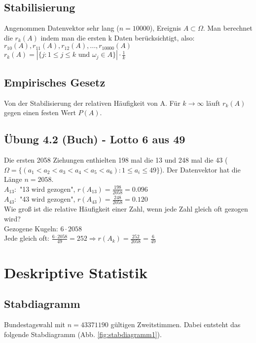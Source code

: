 \subsection{Stabilisierung}
Angenommen Datenvektor sehr lang ($ n = 10 000 $), Ereignis $A \subset \Omega $. Man berechnet die $ r_k(A) $ indem man die ersten k Daten berücksichtigt, also: $ r_{10}(A), r_{11}(A), r_{12}(A), ..., r_{10 000}(A) $ \\
$ r_k(A) = | \{ j : 1\leq j \leq k \textrm{ und } \omega_j \in A \} | \cdot \frac{1}{k} $


\subsection{Empirisches Gesetz}
Von der Stabilisierung der relativen Häufigkeit von A. Für $ k\rightarrow \infty $ läuft $r_k(A) $ gegen einen festen Wert $ P(A) $.

\subsection{Übung 4.2 (Buch) - Lotto 6 aus 49} 
Die ersten 2058 Ziehungen enthielten 198 mal die 13 und 248 mal die 43 ($ \Omega=\{(a_1 < a_2 < a_3 < a_4 < a_5 < a_6) : 1\leq a_i\leq 49 \} $). Der Datenvektor hat die Länge $ n = 2058 $. \\
$ A_{13}: $ "13 wird gezogen", $ r(A_{13}) = \frac{198}{2058} = 0.096 $\\
$ A_{43}: $ "43 wird gezogen", $ r(A_{43}) = \frac{248}{2058} = 0.120 $\\
Wie groß ist die relative Häufigkeit einer Zahl, wenn jede Zahl gleich oft gezogen wird?\\
Gezogene Kugeln: $ 6 \cdot 2058 $\\
Jede gleich oft: $ \frac{6\cdot 2058}{49}=252 \Rightarrow r(A_k)=\frac{252}{2058}=\frac{6}{49} $

\section{Deskriptive Statistik}

\subsection{Stabdiagramm}
Bundestagswahl mit $ n = 43 371 190 $ gültigen Zweitstimmen. Dabei entsteht das folgende Stabdiagramm (Abb. \ref{fig:stabdiagramm1}).

